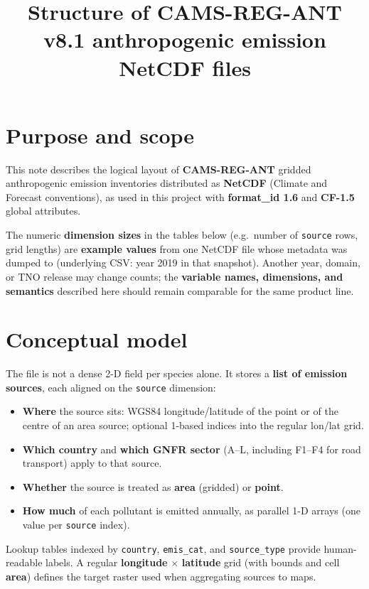 \documentclass[11pt,a4paper]{article}
\title{Structure of CAMS-REG-ANT v8.1 anthropogenic emission NetCDF files}
\author{}
\date{}
\begin{document}
\maketitle

\section{Purpose and scope}

This note describes the logical layout of \textbf{CAMS-REG-ANT} gridded anthropogenic emission inventories distributed as \textbf{NetCDF} (Climate and Forecast conventions), as used in this project with \textbf{format\_id 1.6} and \textbf{CF-1.5} global attributes.

The numeric \textbf{dimension sizes} in the tables below (e.g.\ number of \texttt{source} rows, grid lengths) are \textbf{example values} from one NetCDF file whose metadata was dumped to  (underlying CSV: year 2019 in that snapshot). Another year, domain, or TNO release may change counts; the \textbf{variable names, dimensions, and semantics} described here should remain comparable for the same product line.

\section{Conceptual model}

The file is not a dense 2-D field per species alone. It stores a \textbf{list of emission sources}, each aligned on the \texttt{source} dimension:

\begin{itemize}
  \item \textbf{Where} the source sits: WGS84 longitude/latitude of the point or of the centre of an area source; optional 1-based indices into the regular lon/lat grid.
  \item \textbf{Which country} and \textbf{which GNFR sector} (A--L, including F1--F4 for road transport) apply to that source.
  \item \textbf{Whether} the source is treated as \textbf{area} (gridded) or \textbf{point}.
  \item \textbf{How much} of each pollutant is emitted annually, as parallel 1-D arrays (one value per \texttt{source} index).
\end{itemize}

Lookup tables indexed by \texttt{country}, \texttt{emis\_cat}, and \texttt{source\_type} provide human-readable labels. A regular \textbf{longitude} $\times$ \textbf{latitude} grid (with bounds and cell \textbf{area}) defines the target raster used when aggregating sources to maps.
\end{document}
